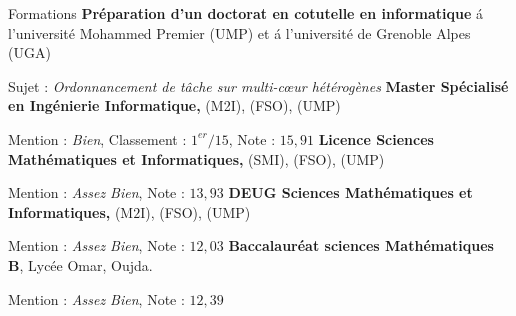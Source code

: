 \begin{rubric}{Formations}
\entry*[$2015$ -- $2018$]%
	\textbf{Pr\'eparation d'un doctorat en cotutelle en informatique} \'a l'universit\'e Mohammed Premier (UMP) et \'a l'universit\'e de Grenoble Alpes (UGA)
	\par Sujet : \emph{Ordonnancement de tâche sur multi-cœur hétérogènes}
%
\entry*[$2014$]%
	\textbf{Master Spécialisé en Ingénierie Informatique,} (M2I), (FSO), (UMP)\par
	Mention : \emph{Bien}, Classement : $1^{er}/15$, Note : $15,91$ 
%
\entry*[$2012$]%
	\textbf{Licence Sciences Mathématiques et Informatiques,} (SMI), (FSO), (UMP) \par
	Mention : \emph{Assez Bien}, Note :  $13,93$
%
\entry*[$2011$]%
	\textbf{DEUG Sciences Mathématiques et Informatiques,} (M$2$I), (FSO), (UMP)\par
	Mention : \emph{Assez Bien}, Note : $12,03$
%
\entry*[$2008$]%
	\textbf{Baccalauréat sciences Mathématiques B}, Lycée Omar, Oujda.\par
	Mention : \emph{Assez Bien}, Note : $12,39$
%
\end{rubric}
